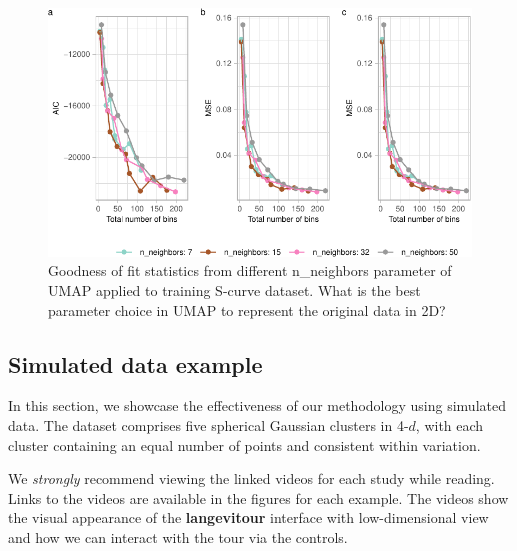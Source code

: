 \documentclass[
  12pt]{article}
\begin{document}
\begin{figure}

{\centering \includegraphics[width=1\textwidth,height=\textheight]{paper_files/figure-pdf/fig-diagnosticpltDiffParam-1.pdf}

}

\caption{\label{fig-diagnosticpltDiffParam}Goodness of fit statistics
from different n\_neighbors parameter of UMAP applied to training
S-curve dataset. What is the best parameter choice in UMAP to represent
the original data in 2D?}

\end{figure}

\hypertarget{sec-simpleex}{%
\subsection{Simulated data example}\label{sec-simpleex}}

In this section, we showcase the effectiveness of our methodology using
simulated data. The dataset comprises five spherical Gaussian clusters
in 4-\(d\), with each cluster containing an equal number of points and
consistent within variation.

We \emph{strongly} recommend viewing the linked videos for each study
while reading. Links to the videos are available in the figures for each
example. The videos show the visual appearance of the
\textbf{langevitour} interface with low-dimensional view and how we can
interact with the tour via the controls.
\end{document}
